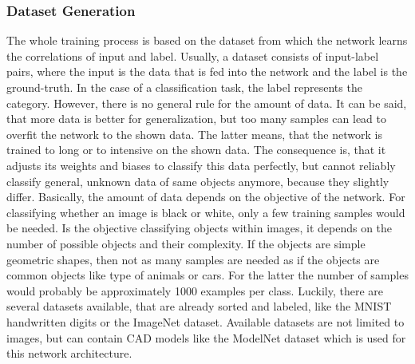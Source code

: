 \subsubsection{Dataset Generation}
\label{sec:dataset-generation}
The whole training process is based on the dataset from which the network learns the correlations of input and label.
Usually, a dataset consists of input-label pairs, where the input is the data that is fed into the network and the label is the ground-truth.
In the case of a classification task, the label represents the category.
However, there is no general rule for the amount of data.
It can be said, that more data is better for generalization, but too many samples can lead to overfit the network to the shown data.
The latter means, that the network is trained to long or to intensive on the shown data.
The consequence is, that it adjusts its weights and biases to classify this data perfectly, but cannot reliably classify general, unknown data of same objects anymore, because they slightly differ.
Basically, the amount of data depends on the objective of the network.
For classifying whether an image is black or white, only a few training samples would be needed.
Is the objective classifying objects within images, it depends on the number of possible objects and their complexity.
If the objects are simple geometric shapes, then not as many samples are needed as if the objects are common objects like type of animals or cars.
For the latter the number of samples would probably be approximately 1000 examples per class.
Luckily, there are several datasets available, that are already sorted and labeled, like the MNIST handwritten digits or the ImageNet dataset.
Available datasets are not limited to images, but can contain CAD models like the ModelNet dataset which is used for this network architecture.

